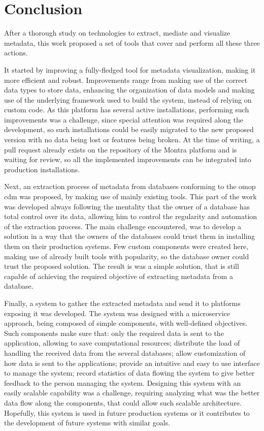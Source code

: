 \chapter{Conclusion}
\label{chapter:conclusion}
After a thorough study on technologies to extract, mediate and visualize metadata, this work proposed a set of tools that cover and perform all these three actions.

It started by improving a fully-fledged tool for metadata visualization, making it more efficient and robust.
Improvements range from making use of the correct data types to store data, enhancing the organization of data models and making use of the underlying framework used to build the system, instead of relying on custom code.
As this platform has several active installations, performing such improvements was a challenge, since special attention was required along the development, so such installations could be easily migrated to the new proposed version with no data being lost or features being broken.
At the time of writing, a pull request already exists on the repository of the Montra platform and is waiting for review, so all the implemented improvements can be integrated into production installations.

Next, an extraction process of metadata from databases conforming to the \gls{omop} \gls{cdm} was proposed, by making use of mainly existing tools.
This part of the work was developed always following the mentality that the owner of a database has total control over its data, allowing him to control the regularity and automation of the extraction process.
The main challenge encountered, was to develop a solution in a way that the owners of the databases could trust them in installing them on their production systems.
Few custom components were created here, making use of already built tools with popularity, so the database owner could trust the proposed solution.
The result is was a simple solution, that is still capable of achieving the required objective of extracting metadata from a database.

Finally, a system to gather the extracted metadata and send it to platforms exposing it was developed.
The system was designed with a microservice approach, being composed of simple components, with well-defined objectives.
Such components make sure that: only the required data is sent to the application, allowing to save computational resources; distribute the load of handling the received data from the several databases; allow customization of how data is sent to the applications; provide an intuitive and easy to use interface to manage the system; record statistics of data flowing the system to give better feedback to the person managing the system.
Designing this system with an easily scalable capability was a challenge, requiring analyzing what was the better data flow along the components, that could allow such scalable architecture.
Hopefully, this system is used in future production systems or it contributes to the development of future systems with similar goals.

